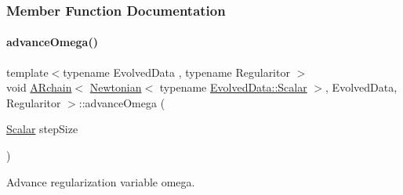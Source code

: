 \subsubsection{Member Function Documentation}
\mbox{\label{class_a_rchain_3_01_newtonian_3_01typename_01_evolved_data_1_1_scalar_01_4_00_01_evolved_data_00_01_regularitor_01_4_a8427d55e9b05fca4a1db2b9024940e06}} 
\paragraph{\texorpdfstring{advance\+Omega()}{advanceOmega()}}
{\footnotesize\ttfamily template$<$typename Evolved\+Data , typename Regularitor $>$ \\
void \mbox{\hyperlink{class_a_rchain}{A\+Rchain}}$<$ \mbox{\hyperlink{class_newtonian}{Newtonian}}$<$ typename \mbox{\hyperlink{class_a_rchain_a707e42a79e4744424a34c9007e84ee07}{Evolved\+Data\+::\+Scalar}} $>$, Evolved\+Data, Regularitor $>$\+::advance\+Omega (\begin{DoxyParamCaption}\item[{\mbox{\hyperlink{class_a_rchain_3_01_newtonian_3_01typename_01_evolved_data_1_1_scalar_01_4_00_01_evolved_data_00_01_regularitor_01_4_a2c77dc1b58a25ac5c6ee95dd7809f693}{Scalar}}}]{step\+Size }\end{DoxyParamCaption})\hspace{0.3cm}{\ttfamily [private]}}



Advance regularization variable omega. 

